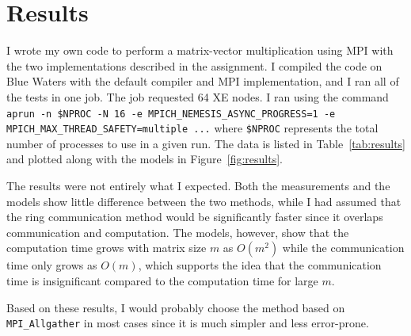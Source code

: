 \documentclass{article}
\begin{document}
\section{Results}

    I wrote my own code to perform a matrix-vector multiplication using MPI with the two implementations described in the assignment. I compiled the code on Blue Waters with the default compiler and MPI implementation, and I ran all of the tests in one job. The job requested 64 XE nodes. I ran using the command \texttt{aprun -n \$NPROC -N 16 -e MPICH\_NEMESIS\_ASYNC\_PROGRESS=1 -e MPICH\_MAX\_THREAD\_SAFETY=multiple ...} where \texttt{\$NPROC} represents the total number of processes to use in a given run. The data is listed in Table~\ref{tab:results} and plotted along with the models in Figure~\ref{fig:results}.

    The results were not entirely what I expected. Both the measurements and the models show little difference between the two methods, while I had assumed that the ring communication method would be significantly faster since it overlaps communication and computation. The models, however, show that the computation time grows with matrix size $m$ as $O(m^2)$ while the communication time only grows as $O(m)$, which supports the idea that the communication time is insignificant compared to the computation time for large $m$.

    Based on these results, I would probably choose the method based on \\\texttt{MPI\_Allgather} in most cases since it is much simpler and less error-prone.
\end{document}
